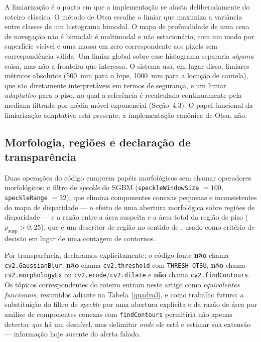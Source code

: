 \documentclass[12pt]{article}
\begin{document}
A limiarização é o ponto em que a implementação se afasta deliberadamente do
roteiro clássico. O método de Otsu \cite{otsu1979} escolhe o limiar que
maximiza a variância entre classes de um histograma bimodal. O mapa de
profundidade de uma cena de navegação não é bimodal: é multimodal e
não estacionário, com um modo por superfície visível e uma massa em zero
correspondente aos pixels sem correspondência válida. Um limiar global sobre
esse histograma separaria \emph{alguma} coisa, mas não a fronteira que
interessa. O sistema usa, em lugar disso, limiares métricos absolutos
(500~mm para o bipe, 1000~mm para a locução de cautela), que são
diretamente interpretáveis em termos de segurança, e um limiar
\emph{adaptativo} para o piso, no qual a referência é recalculada
continuamente pela mediana filtrada por média móvel exponencial
(Seção~4.3). O papel funcional da limiarização adaptativa está presente;
a implementação canônica de Otsu, não.

\subsection{Morfologia, regiões e declaração de transparência}

Duas operações do código cumprem papéis morfológicos sem chamar operadores
morfológicos: o filtro de \textit{speckle} do SGBM
(\texttt{speckleWindowSize} $= 100$, \texttt{speckleRange} $= 32$), que
elimina componentes conexas pequenas e inconsistentes do mapa de disparidade
--- o efeito de uma abertura morfológica sobre regiões de disparidade --- e a
razão entre a área suspeita e a área total da região de piso
($\rho_{\text{susp}} > 0{,}25$), que é um descritor de região no sentido de
\cite{gonzalez2018}, usado como critério de decisão em lugar de uma contagem
de contornos.

Por transparência, declaramos explicitamente: o código-fonte
\textbf{não} chama \texttt{cv2.GaussianBlur}, \textbf{não} chama
\texttt{cv2.threshold} com \texttt{THRESH\_OTSU}, \textbf{não} chama
\texttt{cv2.morphologyEx} ou \texttt{cv2.erode}/\texttt{cv2.dilate} e
\textbf{não} chama \texttt{cv2.findContours}. Os tópicos correspondentes do
roteiro entram neste artigo como \emph{equivalentes funcionais}, resumidos
adiante na Tabela~\ref{quadro3}, e como trabalho futuro: a substituição do filtro de
\textit{speckle} por uma abertura explícita e da razão de área por análise de
componentes conexas com \texttt{findContours} permitiria não apenas detectar
\emph{que} há um desnível, mas delimitar \emph{onde} ele está e estimar sua
extensão --- informação hoje ausente do alerta falado.
\end{document}
